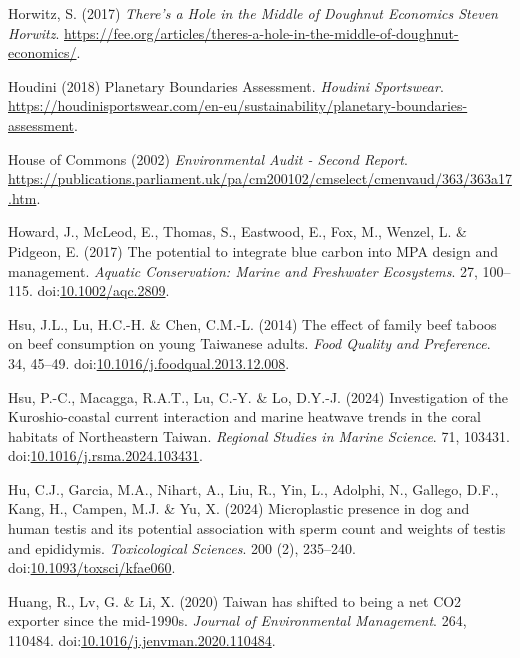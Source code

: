 \documentclass[
  letterpaper,
  DIV=11,
  numbers=noendperiod]{scrartcl}
\newlength{\cslhangindent}
\newenvironment{CSLReferences}[2] %
 {\begin{list}{}{%
  \setlength{\itemindent}{0pt}
  \setlength{\leftmargin}{0pt}
  \setlength{\parsep}{0pt}
  \ifodd #1
   \setlength{\leftmargin}{\cslhangindent}
   \setlength{\itemindent}{-1\cslhangindent}
  \fi
  \setlength{\itemsep}{#2\baselineskip}}}
 {\end{list}}
\begin{document}
\begin{CSLReferences}{0}{1}
Horwitz, S. (2017) \emph{There's a {Hole} in the {Middle} of {Doughnut
Economics} {\textbar} {Steven Horwitz}}.
\url{https://fee.org/articles/theres-a-hole-in-the-middle-of-doughnut-economics/}.

Houdini (2018) Planetary {Boundaries Assessment}. \emph{Houdini
Sportswear}.
\url{https://houdinisportswear.com/en-eu/sustainability/planetary-boundaries-assessment}.

House of Commons (2002) \emph{Environmental {Audit} - {Second Report}}.
\url{https://publications.parliament.uk/pa/cm200102/cmselect/cmenvaud/363/363a17.htm}.

Howard, J., McLeod, E., Thomas, S., Eastwood, E., Fox, M., Wenzel, L. \&
Pidgeon, E. (2017) The potential to integrate blue carbon into {MPA}
design and management. \emph{Aquatic Conservation: Marine and Freshwater
Ecosystems}. 27, 100--115.
doi:\href{https://doi.org/10.1002/aqc.2809}{10.1002/aqc.2809}.

Hsu, J.L., Lu, H.C.-H. \& Chen, C.M.-L. (2014) The effect of family beef
taboos on beef consumption on young {Taiwanese} adults. \emph{Food
Quality and Preference}. 34, 45--49.
doi:\href{https://doi.org/10.1016/j.foodqual.2013.12.008}{10.1016/j.foodqual.2013.12.008}.

Hsu, P.-C., Macagga, R.A.T., Lu, C.-Y. \& Lo, D.Y.-J. (2024)
Investigation of the {Kuroshio-coastal} current interaction and marine
heatwave trends in the coral habitats of {Northeastern Taiwan}.
\emph{Regional Studies in Marine Science}. 71, 103431.
doi:\href{https://doi.org/10.1016/j.rsma.2024.103431}{10.1016/j.rsma.2024.103431}.

Hu, C.J., Garcia, M.A., Nihart, A., Liu, R., Yin, L., Adolphi, N.,
Gallego, D.F., Kang, H., Campen, M.J. \& Yu, X. (2024) Microplastic
presence in dog and human testis and its potential association with
sperm count and weights of testis and epididymis. \emph{Toxicological
Sciences}. 200 (2), 235--240.
doi:\href{https://doi.org/10.1093/toxsci/kfae060}{10.1093/toxsci/kfae060}.

Huang, R., Lv, G. \& Li, X. (2020) Taiwan has shifted to being a net
{CO2} exporter since the mid-1990s. \emph{Journal of Environmental
Management}. 264, 110484.
doi:\href{https://doi.org/10.1016/j.jenvman.2020.110484}{10.1016/j.jenvman.2020.110484}.


\end{CSLReferences}
\end{document}
